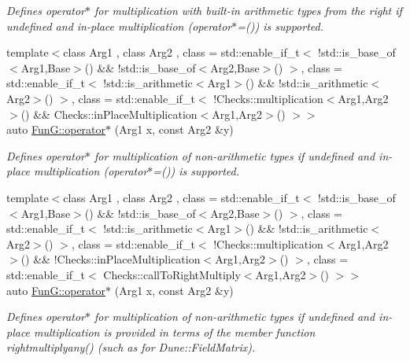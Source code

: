 \begin{DoxyCompactItemize}
\begin{DoxyCompactList}\small\item\em Defines operator$\ast$ for multiplication with built-\/in arithmetic types from the right if undefined and in-\/place multiplication (operator$\ast$=()) is supported. \end{DoxyCompactList}\item 
{\footnotesize template$<$class Arg1 , class Arg2 , class  = std\+::enable\+\_\+if\+\_\+t$<$ !std\+::is\+\_\+base\+\_\+of$<$\+Arg1,\+Base$>$() \&\& !std\+::is\+\_\+base\+\_\+of$<$\+Arg2,\+Base$>$() $>$, class  = std\+::enable\+\_\+if\+\_\+t$<$ !std\+::is\+\_\+arithmetic$<$\+Arg1$>$() \&\& !std\+::is\+\_\+arithmetic$<$\+Arg2$>$() $>$, class  = std\+::enable\+\_\+if\+\_\+t$<$ !\+Checks\+::multiplication$<$\+Arg1,\+Arg2$>$() \&\&                                       Checks\+::in\+Place\+Multiplication$<$\+Arg1,\+Arg2$>$() $>$$>$ }\\auto \hyperlink{namespaceFunG_ad023f2d2273af693f2b4ebceeb296dc8}{Fun\+G\+::operator$\ast$} (Arg1 x, const Arg2 \&y)
\begin{DoxyCompactList}\small\item\em Defines operator$\ast$ for multiplication of non-\/arithmetic types if undefined and in-\/place multiplication (operator$\ast$=()) is supported. \end{DoxyCompactList}\item 
{\footnotesize template$<$class Arg1 , class Arg2 , class  = std\+::enable\+\_\+if\+\_\+t$<$ !std\+::is\+\_\+base\+\_\+of$<$\+Arg1,\+Base$>$() \&\& !std\+::is\+\_\+base\+\_\+of$<$\+Arg2,\+Base$>$() $>$, class  = std\+::enable\+\_\+if\+\_\+t$<$ !std\+::is\+\_\+arithmetic$<$\+Arg1$>$() \&\& !std\+::is\+\_\+arithmetic$<$\+Arg2$>$() $>$, class  = std\+::enable\+\_\+if\+\_\+t$<$ !\+Checks\+::multiplication$<$\+Arg1,\+Arg2$>$() \&\&                                       !\+Checks\+::in\+Place\+Multiplication$<$\+Arg1,\+Arg2$>$() $>$, class  = std\+::enable\+\_\+if\+\_\+t$<$ Checks\+::call\+To\+Right\+Multiply$<$\+Arg1,\+Arg2$>$() $>$$>$ }\\auto \hyperlink{namespaceFunG_a6e4d3266e119cd102800bf5c091e57fd}{Fun\+G\+::operator$\ast$} (Arg1 x, const Arg2 \&y)
\begin{DoxyCompactList}\small\item\em Defines operator$\ast$ for multiplication of non-\/arithmetic types if undefined and in-\/place multiplication is provided in terms of the member function rightmultiplyany() (such as for Dune\+::\+Field\+Matrix). \end{DoxyCompactList}\end{DoxyCompactItemize}
